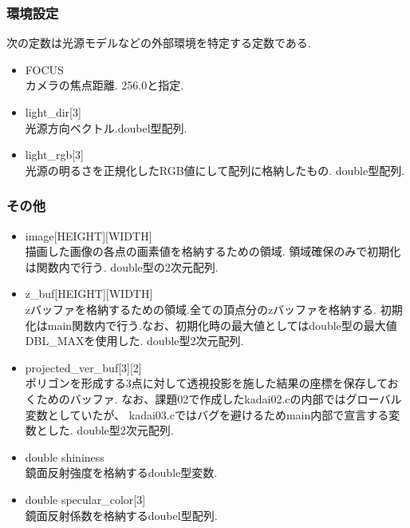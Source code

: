 \documentclass[a4j,dvipdfmx]{jsarticle}
\begin{document}
\subsubsection{環境設定}
次の定数は光源モデルなどの外部環境を特定する定数である.
\begin{itemize}
\item FOCUS\\
  カメラの焦点距離. 256.0と指定.
  
\item light\_dir[3]\\
  光源方向ベクトル.doubel型配列.
  
\item light\_rgb[3]\\
  光源の明るさを正規化したRGB値にして配列に格納したもの.
  double型配列.
  
\end{itemize}
\subsubsection{その他}
\begin{itemize}
\item image[HEIGHT][WIDTH]\\
  描画した画像の各点の画素値を格納するための領域.
  領域確保のみで初期化は関数内で行う.
  double型の2次元配列.

\item z\_buf[HEIGHT][WIDTH]\\
  zバッファを格納するための領域.全ての頂点分のzバッファを格納する.
  初期化はmain関数内で行う.なお、初期化時の最大値としてはdouble型の最大値
  DBL\_MAXを使用した.
  double型2次元配列.
  
\item projected\_ver\_buf[3][2]\\
  ポリゴンを形成する3点に対して透視投影を施した結果の座標を保存しておくためのバッファ.
  なお、課題02で作成したkadai02.cの内部ではグローバル変数としていたが、
  kadai03.cではバグを避けるためmain内部で宣言する変数とした.
  double型2次元配列.
\item double shininess\\
  鏡面反射強度を格納するdouble型変数.
  
\item double specular\_color[3]\\
  鏡面反射係数を格納するdoubel型配列.
\end{itemize}
\end{document}
